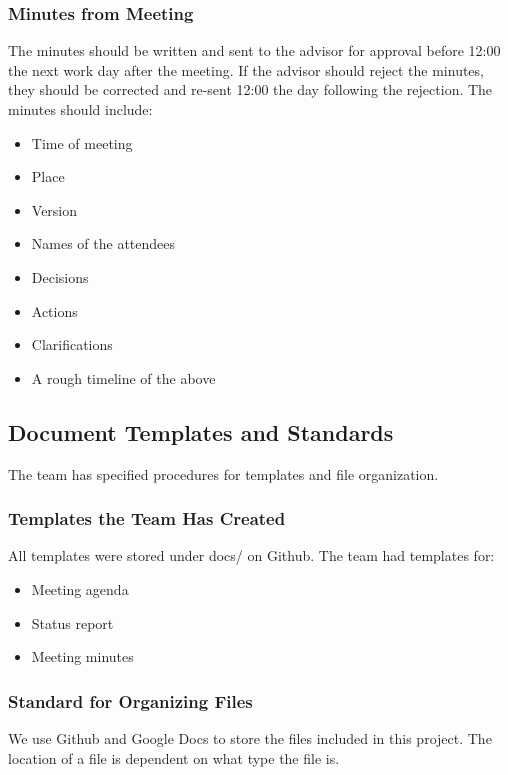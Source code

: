 \subsubsection{Minutes from Meeting}
The minutes should be written and sent to the advisor for approval before 12:00 the next work day after the meeting. If the advisor should reject the minutes, they should be corrected and re-sent 12:00 the day following the rejection. The minutes should include:
\begin{itemize}
	\item Time of meeting
	\item Place
	\item Version
	\item Names of the attendees
	\item Decisions
	\item Actions
	\item Clarifications
	\item A rough timeline of the above
\end{itemize}

\subsection{Document Templates and Standards}
The team has specified procedures for templates and file organization.

\subsubsection{Templates the Team Has Created}
All templates were stored under docs/ on Github. The team had templates for:

\begin{itemize}
	\item Meeting agenda
	\item Status report
	\item Meeting minutes
\end{itemize}

\subsubsection{Standard for Organizing Files}
We use Github and Google Docs to store the files included in this project. The
location of a file is dependent on what type the file is. 

